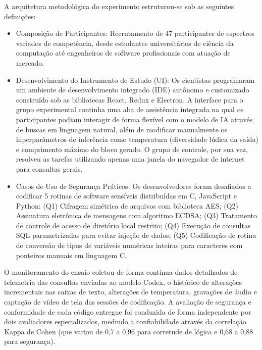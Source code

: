 A arquitetura metodológica do experimento estruturou-se sob as seguintes definições:
\begin{itemize}
    \item Composição de Participantes: Recrutamento de 47 participantes de espectros variados de competência, desde estudantes universitários de ciência da computação até engenheiros de software profissionais com atuação de mercado.
    \item Desenvolvimento do Instrumento de Estudo (UI): Os cientistas programaram um ambiente de desenvolvimento integrado (IDE) autônomo e customizado construído sob as bibliotecas React, Redux e Electron. A interface para o grupo experimental continha uma aba de assistência integrada na qual os participantes podiam interagir de forma flexível com o modelo de IA através de buscas em linguagem natural, além de modificar manualmente os hiperparâmetros de inferência como temperatura (diversidade lúdica da saída) e comprimento máximo do bloco gerado. O grupo de controle, por sua vez, resolveu as tarefas utilizando apenas uma janela do navegador de internet para consultas gerais.
    \item Casos de Uso de Segurança Práticos: Os desenvolvedores foram desafiados a codificar 5 rotinas de software sensíveis distribuídas em C, JavaScript e Python: (Q1) Cifragem simétrica de arquivos com biblioteca AES; (Q2) Assinatura eletrônica de mensagens com algoritmo ECDSA; (Q3) Tratamento de controle de acesso de diretório local restrito; (Q4) Execução de consultas SQL parametrizadas para evitar injeção de dados; (Q5) Codificação de rotina de conversão de tipos de variáveis numéricas inteiras para caracteres com ponteiros manuais em linguagem C.
\end{itemize}

O monitoramento do ensaio coletou de forma contínua dados detalhados de telemetria das consultas enviadas ao modelo Codex, o histórico de alterações incrementais nas caixas de texto, alterações de temperatura, gravações de áudio e captação de vídeo de tela das sessões de codificação. A avaliação de segurança e conformidade de cada código entregue foi conduzida de forma independente por dois avaliadores especializados, medindo a confiabilidade através da correlação Kappa de Cohen (que variou de 0,7 a 0,96 para corretude de lógica e 0,68 a 0,88 para segurança).

